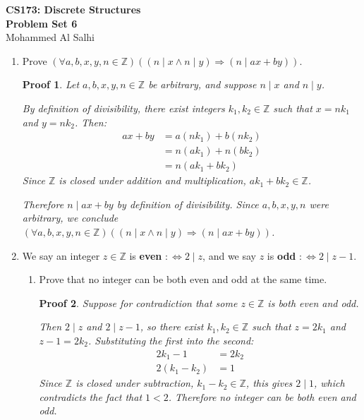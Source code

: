 \documentclass[12pt]{article}
\newcommand{\defn}[1]{\textbf{#1}}
\newcommand{\Z}{\mathbb{Z}}
\theoremstyle{proofstyle}
\newtheorem*{proof*}{Proof}
\renewcommand{\maketitle}{%
  \begin{flushleft}
    {\Large\bfseries CS173: Discrete Structures}\\[0.3em]
    {\Large\bfseries Problem Set 6}\\[0.5em]
    {\normalsize Mohammed Al Salhi}
  \end{flushleft}
  \vspace{1em}
}
\begin{document}
\maketitle

\begin{enumerate}[left=0pt, itemsep=2em, parsep=1em]

\item Prove $(\forall a, b, x, y, n \in \Z)((n \mid x \land n \mid y) \Rightarrow (n \mid ax + by))$.

\begin{proof*}
Let $a, b, x, y, n \in \Z$ be arbitrary, and suppose $n \mid x$ and $n \mid y$.

By definition of divisibility, there exist integers $k_1, k_2 \in \Z$ such that $x = n k_1$ and $y = n k_2$. Then:
\begin{align*}
  ax + by &= a(nk_1) + b(nk_2) \\
          &= n(ak_1) + n(bk_2) \\
          &= n(ak_1 + bk_2)
\end{align*}
Since $\Z$ is closed under addition and multiplication, $ak_1 + bk_2 \in \Z$.

Therefore $n \mid ax + by$ by definition of divisibility. Since $a, b, x, y, n$ were arbitrary, we conclude $(\forall a, b, x, y, n \in \Z)((n \mid x \land n \mid y) \Rightarrow (n \mid ax + by))$.
\end{proof*}

\item We say an integer $z \in \Z$ is \defn{even} $:\Leftrightarrow 2 \mid z$, and we say $z$ is \defn{odd} $:\Leftrightarrow 2 \mid z - 1$.

\begin{enumerate}[label=(\alph*), itemsep=1.5em, leftmargin=2em]

  \item Prove that no integer can be both even and odd at the same time.

  \begin{proof*}
  Suppose for contradiction that some $z \in \Z$ is both even and odd.

  Then $2 \mid z$ and $2 \mid z - 1$, so there exist $k_1, k_2 \in \Z$ such that $z = 2k_1$ and $z - 1 = 2k_2$. Substituting the first into the second:
  \begin{align*}
    2k_1 - 1 &= 2k_2 \\
    2(k_1 - k_2) &= 1
  \end{align*}
  Since $\Z$ is closed under subtraction, $k_1 - k_2 \in \Z$, this gives $2 \mid 1$, which contradicts the fact that $1 < 2$. Therefore no integer can be both even and odd.
  \end{proof*}


\end{enumerate}
\end{enumerate}
\end{document}
